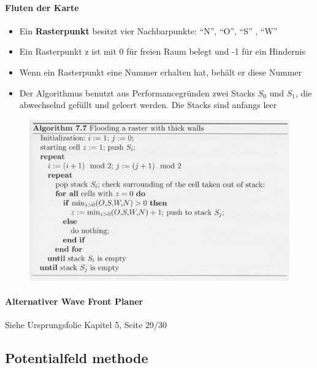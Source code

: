 \paragraph{Fluten der Karte}
\begin{itemize}
	\item Ein \textbf{Rasterpunkt} besitzt vier Nachbarpunkte: \enquote{N}, \enquote{O}, \enquote{S} , \enquote{W}
	\item Ein Rasterpunkt z ist mit 0 für freien Raum belegt und -1 für ein Hindernis
	\item Wenn ein Rasterpunkt eine Nummer erhalten hat, behält er diese Nummer
	\item Der Algorithmus benutzt aus Performancegründen zwei Stacks $S_0$ und $S_1$, die abwechselnd gefüllt und geleert werden. Die Stacks sind anfangs leer
\end{itemize}
\begin{figure}[H]
	\begin{center}
		\includegraphics[]{Resources/PNG/Flooding.PNG}
		\caption{}
		\label{fig:PNG/Flooding.PNG}
	\end{center}
\end{figure}
\paragraph{Alternativer Wave Front Planer}
Siehe Ursprungsfolie Kapitel 5, Seite 29/30
\subsection{Potentialfeld methode}
